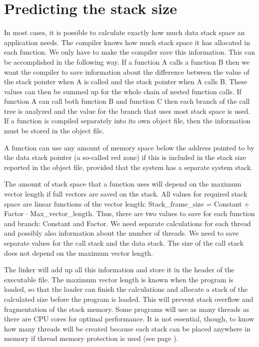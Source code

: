 \documentclass[forwardcom.tex]{subfiles}
\begin{document}
\section{Predicting the stack size} \label{predictingStackSize}
In most cases, it is possible to calculate exactly how much data stack space an application needs. The compiler knows how much stack space it has allocated in each function. We only have to make the compiler save this information. This can be accomplished in the following way. If a function A calls a function B then we want the compiler to save information about the difference between the value of the stack pointer when A is called and the stack pointer when A calls B. These values can then be summed up for the whole chain of nested function calls. If function A can call both function B and function C then each branch of the call tree is analyzed and the value for the branch that uses most stack space is used. If a function is compiled separately into its own object file, then the information must be stored in the object file. 
\vv

A function can use any amount of memory space below the address pointed to by the data stack pointer (a so-called red zone) if this is included in the stack size reported in the object file, provided that the system has a separate system stack. 
\vv

The amount of stack space that a function uses will depend on the maximum vector length if full vectors are saved on the stack. All values for required stack space are linear functions of the vector length: Stack\_frame\_size = Constant + Factor $\cdot$ Max\_vector\_length. Thus, there are two values to save for each function and branch: Constant and Factor. We need separate calculations for each thread and possibly also information about the number of threads. We need to save separate values for the call stack and the data stack. The size of the call stack does not depend on the maximum vector length. 
\vv

The linker will add up all this information and store it in the header of the executable file. The maximum vector length is known when the program is loaded, so that the loader can finish the calculations and allocate a stack of the calculated size before the program is loaded. This will prevent stack overflow and fragmentation of the stack memory. Some programs will use as many threads as there are CPU cores for optimal performance. It is not essential, though, to know how many threads will be created because each stack can be placed anywhere in memory if thread memory protection is used (see page \pageref{threadMemoryProtection}). 
\vv
\end{document}
